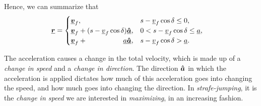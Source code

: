 Hence, we can summarize that
\begin{align}
\label{eq:r}
\vec{\flat{r}} &=
\begin{cases}
\vec{\flat{v}}_f, & s - \flat{v}_f \cos\delta \le 0,\\
\vec{\flat{v}}_f + (s - \flat{v}_f \cos\delta)\uvec{\flat{a}}, & 0 < s - \flat{v}_f \cos\delta \le \flat{a},\\
\vec{\flat{v}}_f + \mathmakebox[\widthof{$(s - \flat{v}_f \cos\delta)$}][r]{\flat{a}} \uvec{\flat{a}}, & s - \flat{v}_f \cos\delta > \flat{a}.
\end{cases}
\end{align}

The acceleration causes a change in the total velocity, which is made up of a \emph{change in speed} and a \emph{change in direction}. The direction $\boldsymbol{\hat{a}}$ in which the acceleration is applied dictates how much of this acceleration goes into changing the speed, and how much goes into changing the direction. In \emph{strafe-jumping}, it is the \emph{change in speed} we are interested in \emph{maximizing}, in an increasing fashion.

